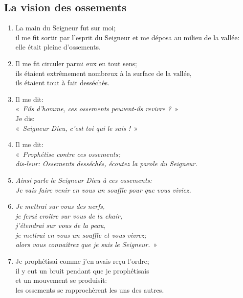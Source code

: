 \subsection*{La vision des ossements}
\begin{enumerate}[leftmargin=\psleftmargin, labelsep = \pslabelsep, label={\arabic*}, font=\color{\pscolor}\small\textsuperscript, parsep=0em, itemsep=0em, topsep=0em ]
    \item La main du Seigneur fut sur moi; \\ il me fit sortir par l’esprit du Seigneur et me déposa au milieu de la vallée: \\ elle était pleine d’ossements.
    \item Il me fit circuler parmi eux en tout sens; \\ ils étaient extrêmement nombreux à la surface de la vallée, \\ ils étaient tout à fait desséchés.
    \item Il me dit: \\ \decalage «~\textit{Fils d’homme, ces ossements peuvent-ils revivre ?}~» \\ Je dis: \\
          \decalage «~\textit{Seigneur Dieu, c’est toi qui le sais !}~»
    \item Il me dit: \\ \decalage «~\textit{Prophétise contre ces ossements; \\ \decalage dis-leur: Ossements desséchés, écoutez la parole du Seigneur.}
    \item \decalage \textit{Ainsi parle le Seigneur Dieu à ces ossements: \\ \decalage Je vais faire venir en vous un souffle pour que vous viviez.}
    \item \decalage \textit{Je mettrai sur vous des nerfs, \\ \decalage je ferai croître sur vous de la chair, \\ \decalage j’étendrai sur vous de la peau, \\ \decalage je mettrai en vous un souffle et vous vivrez; \\ \decalage alors vous connaîtrez que je suis le Seigneur.}~»
    \item Je prophétisai comme j’en avais reçu l’ordre; \\ il y eut un bruit pendant que je prophétisais \\ et un mouvement se produisit: \\ les ossements se rapprochèrent les uns des autres.

\end{enumerate}
